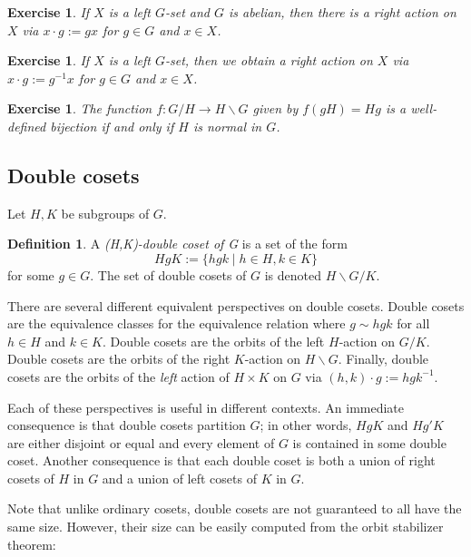 \documentclass[12pt]{article}
\theoremstyle{plain}
\newtheorem{exercise}[theorem]{Exercise}
\theoremstyle{definition}
\newtheorem{definition}[theorem]{Definition}
\theoremstyle{remark}
\numberwithin{equation}{section}
\begin{document}
\begin{exercise}
If $X$ is a \emph{left} $G$-set and $G$ is abelian, then there is a
\emph{right} action on $X$ via $x \cdot g := gx$ for $g \in G$ and $x \in X$.
\end{exercise}

\begin{exercise}
If $X$ is a \emph{left} $G$-set, then we obtain a \emph{right}
action on $X$ via $x \cdot g := g^{-1}x$ for $g \in G$ and $x \in X$.
\end{exercise}

\begin{exercise}
The function $f : G/H \to H\backslash G$ given by $f(gH)=Hg$ is a
well-defined bijection if and only if $H$ is normal in $G$.
\end{exercise}

\subsection{Double cosets}

Let $H, K$ be subgroups of $G$.

\begin{definition}
A \emph{(H,K)-double coset of G} is a set of the form
\[
HgK := \{ hgk \mid h \in H, k \in K \}
\]
for some $g \in G$.
The set of double cosets of $G$ is denoted
$H \backslash G / K$.
\end{definition}

There are several different equivalent perspectives on double cosets.
Double cosets are the equivalence classes for the equivalence relation
where $g \sim hgk$ for all $h \in H$ and $k \in K$.
Double cosets are the orbits of the left $H$-action on $G/K$.
Double cosets are the orbits of the right $K$-action on $H\backslash G$.
Finally, double cosets are the orbits of the \emph{left} action
of $H \times K$ on $G$ via $(h,k)\cdot g := hgk^{-1}$.

Each of these perspectives is useful in different contexts.
An immediate consequence is that double cosets partition $G$;
in other words, $HgK$ and $Hg'K$ are either disjoint or equal
and every element of $G$ is contained in some double coset.
Another consequence is that each double coset is both a union of
right cosets of $H$ in $G$ and a union of left cosets of $K$ in $G$.

Note that unlike ordinary cosets, double cosets are not guaranteed to
all have the same size.  However, their size can be easily computed
from the orbit stabilizer theorem:
\end{document}
